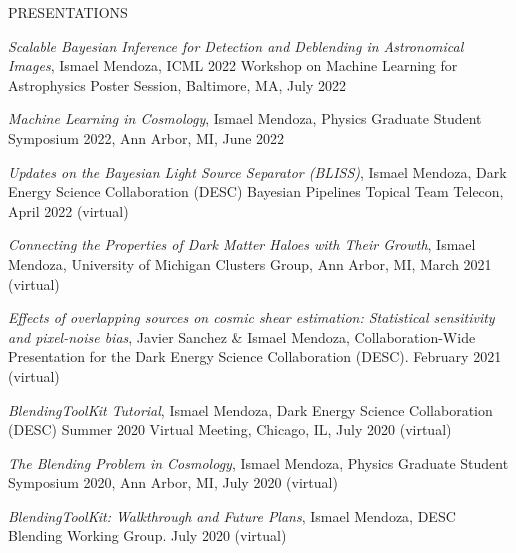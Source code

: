 \documentclass{resume} %
\begin{document}
\begin{rSection}{PRESENTATIONS}
\item \textit{Scalable Bayesian Inference for Detection and Deblending in Astronomical Images}, Ismael Mendoza, ICML 2022 Workshop on Machine Learning for Astrophysics Poster Session, Baltimore, MA, July 2022

\item \textit{Machine Learning in Cosmology}, Ismael Mendoza, Physics Graduate Student Symposium 2022, Ann Arbor, MI, June 2022

\item \textit{Updates on the Bayesian Light Source Separator (BLISS)}, Ismael Mendoza, Dark Energy Science Collaboration (DESC) Bayesian Pipelines Topical Team Telecon, April 2022 (virtual)





\item \textit{Connecting the Properties of Dark Matter Haloes with Their Growth}, Ismael Mendoza, University of Michigan Clusters Group, Ann Arbor, MI, March 2021 (virtual)
%
\item \textit{Effects of overlapping sources on cosmic shear estimation: Statistical sensitivity and pixel-noise bias}, Javier Sanchez \& Ismael Mendoza, Collaboration-Wide Presentation for the Dark Energy Science Collaboration (DESC). February 2021 (virtual)
%
%
\item \textit{BlendingToolKit Tutorial}, Ismael Mendoza, Dark Energy Science Collaboration (DESC) Summer 2020 Virtual Meeting, Chicago, IL, July 2020 (virtual)
%
\item \textit{The Blending Problem in Cosmology}, Ismael Mendoza, Physics Graduate Student Symposium 2020, Ann Arbor, MI, July 2020 (virtual)
%
\item \textit{BlendingToolKit: Walkthrough and Future Plans}, Ismael Mendoza, DESC Blending Working Group. July 2020 (virtual)
\end{rSection}
\end{document}
